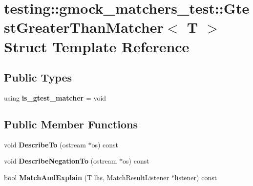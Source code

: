 \hypertarget{structtesting_1_1gmock__matchers__test_1_1GtestGreaterThanMatcher}{}\section{testing\+:\+:gmock\+\_\+matchers\+\_\+test\+:\+:Gtest\+Greater\+Than\+Matcher$<$ T $>$ Struct Template Reference}
\label{structtesting_1_1gmock__matchers__test_1_1GtestGreaterThanMatcher}
\subsection*{Public Types}
\begin{DoxyCompactItemize}
\item 
\mbox{\label{structtesting_1_1gmock__matchers__test_1_1GtestGreaterThanMatcher_a6d5955d1c75d6f56729af925aa1fc294}} 
using {\bfseries is\+\_\+gtest\+\_\+matcher} = void
\end{DoxyCompactItemize}
\subsection*{Public Member Functions}
\begin{DoxyCompactItemize}
\item 
\mbox{\label{structtesting_1_1gmock__matchers__test_1_1GtestGreaterThanMatcher_a4274ad4c7b7daf8911553bfb13bc607b}} 
void {\bfseries Describe\+To} (ostream $\ast$os) const
\item 
\mbox{\label{structtesting_1_1gmock__matchers__test_1_1GtestGreaterThanMatcher_ad872d939e52bfc52348debf8cb1bd65d}} 
void {\bfseries Describe\+Negation\+To} (ostream $\ast$os) const
\item 
\mbox{\label{structtesting_1_1gmock__matchers__test_1_1GtestGreaterThanMatcher_aca3d131caab12c50ea825de1d5755361}} 
bool {\bfseries Match\+And\+Explain} (T lhs, Match\+Result\+Listener $\ast$listener) const
\end{DoxyCompactItemize}
